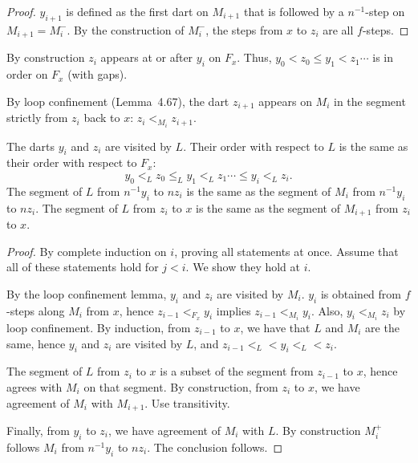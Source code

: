 \begin{proof} $y_{i+1}$ is defined as the first dart on $M_{i+1}$
that is followed by a $n^{-1}$-step on $M_{i+1} = M_i^-$.  By the
construction of $M_i^-$,
the steps from $x$ to $z_i$ are all $f$-steps.
\end{proof}

By construction $z_i$ appears at or after $y_i$ on $F_x$.  Thus,
$y_0 < z_0 \le y_1 < z_1\cdots$ is in order on $F_x$ (with gaps).

By loop confinement (Lemma~4.67), the dart $z_{i+1}$ appears on
$M_i$ in the segment strictly from $z_i$ back to $x$:
$z_i <_{M_i} z_{i+1}$.

\begin{lemma} 
The darts $y_i$ and $z_i$ are visited by $L$.  Their order with
respect to $L$ is the same as their order with respect to $F_x$:
\[
y_0 <_L z_0 \le_L y_1 <_L z_1\cdots \le y_i <_L z_i.
\]
The segment of $L$ from $n^{-1} y_i$ to $n z_i$ is the same
as the segment of $M_i$ from $n^{-1}y_i$ to $n z_i$.
The segment of $L$ from $z_i$ to $x$ is the same as the
segment of $M_{i+1}$ from $z_i$ to $x$.
\end{lemma} 

\begin{proof} By complete induction on $i$, proving all statements
at once.  
Assume that all of these statements hold for $j<i$. We show they
hold at $i$.


By the loop confinement lemma, $y_i$ and $z_i$ are visited by $M_i$.
$y_i$ is obtained from $f$-steps along $M_i$ from $x$, hence
$z_{i-1} <_{F_x} y_i$ implies $z_{i-1} <_{M_i} y_i$.  Also, $y_i <_{M_i} z_i$
by loop confinement.  By induction, from $z_{i-1}$ to $x$, we have that
$L$ and $M_i$ are the same, hence $y_i$ and $z_i$ are visited by $L$, and $z_{i-1} <_L < y_i <_L < z_i$.

The segment of $L$ from $z_i$ to $x$ is a subset of the segment
from $z_{i-1}$ to $x$, hence agrees with $M_i$ on that segment.
By construction, from $z_{i}$ to $x$, we have agreement of $M_i$ with
$M_{i+1}$.  Use transitivity.

Finally, from $y_i$ to $z_i$, we have agreement of $M_i$ with $L$.
By construction $M_i^+$ follows $M_i$ from $n^{-1}y_i$ to $n z_i$.
The conclusion follows.
\end{proof}

